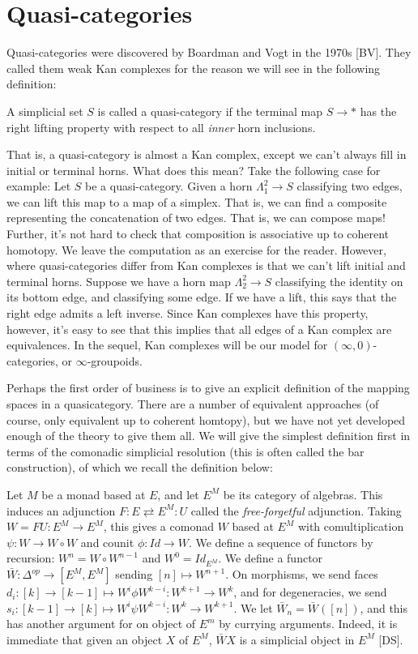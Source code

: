 \documentclass{amsart}
\begin{document}
\section{Quasi-categories}

Quasi-categories were discovered by Boardman and Vogt in the 1970s [BV].  They called them weak Kan complexes for the reason we will see in the following definition:

\begin{defn}
A simplicial set $S$ is called a quasi-category if the terminal map $S\to *$ has the right lifting property with respect to all \emph{inner} horn inclusions.
\end{defn}

That is, a quasi-category is almost a Kan complex, except we can't always fill in initial or terminal horns. What does this mean?  Take the following case for example:  Let $S$ be a quasi-category.  Given a horn $\Lambda^2_1\to S$ classifying two edges, we can lift this map to a map of a simplex.  That is, we can find a composite representing the concatenation of two edges.  That is, we can compose maps!  Further, it's not hard to check that composition is associative up to coherent homotopy.  We leave the computation as an exercise for the reader. However, where quasi-categories differ from Kan complexes is that we can't lift initial and terminal horns.  Suppose we have a horn map $\Lambda^2_2\to S$ classifying the identity on its bottom edge, and classifying some edge.  If we have a lift, this says that the right edge admits a left inverse.  Since Kan complexes have this property, however, it's easy to see that this implies that all edges of a Kan complex are equivalences.  In the sequel, Kan complexes will be our model for $(\infty,0)$-categories, or $\infty$-groupoids.   

Perhaps the first order of business is to give an explicit definition of the mapping spaces in a quasicategory.  There are a number of equivalent approaches (of course, only equivalent up to coherent homtopy), but we have not yet developed enough of the theory to give them all.  We will give the simplest definition first in terms of the comonadic simplicial resolution (this is often called the bar construction), of which we recall the definition below:

Let $M$ be a monad based at $E$, and let $E^M$ be its category of algebras.  This induces an adjunction $F:E\rightleftarrows E^M:U$ called the \emph{free-forgetful} adjunction.  Taking $W=FU:E^M\to E^M$, this gives a comonad $W$ based at $E^M$ with comultiplication $\psi: W\to W\circ W$ and counit $\phi:Id\to W$.  We define a sequence of functors by recursion: $W^n=W\circ W^{n-1}$ and $W^0=Id_{E^M}$.  We define a functor $\bar{W}:\Delta^{op}\to [E^M,E^M]$ sending $[n]\mapsto W^{n+1}$.  On morphisms, we send faces $d_i:[k]\to[k-1]\mapsto W^i\phi W^{k-i}:W^{k+1}\to {W^k}$, and for degeneracies, we send $s_i:[k-1]\to [k]\mapsto W^i\psi W^{k-i}:W^k\to W^{k+1}$.  We let $\bar{W}_n=\bar{W}([n])$, and this has another argument for on object of $E^m$ by currying arguments.  Indeed, it is immediate that given an object $X$ of $E^M$, $\bar{W}X$ is a simplicial object in $E^M$ [DS].  
\end{document}
